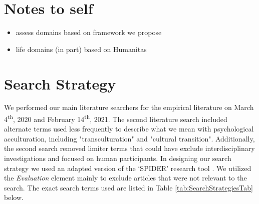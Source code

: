 \documentclass[man, 12pt, a4paper]{apa7}
\begin{document}
\section{Notes to self}
\begin{itemize}
  \item assess domains based on framework we propose
  \item life domains (in part) based on Humanitas
\end{itemize}

\printbibliography

\appendix

\section{Search Strategy}
\label{app:AppendixSearchStrategy}

We performed our main literature searchers for the empirical literature on March 4\textsuperscript{th}, 2020 and February 14\textsuperscript{th}, 2021. The second literature search included alternate terms used less frequently to describe what we mean with psychological acculturation, including "transculturation" and "cultural transition". Additionally, the second search removed limiter terms that could have exclude interdisciplinary investigations and focused on human participants.
In designing our search strategy we used an adapted version of the `SPIDER' research tool \citep[e.g.,][]{Cooke2012}. We utilized the \textit{Evaluation} element mainly to exclude articles that were not relevant to the search. The exact search terms used are listed in Table \ref{tab:SearchStrategiesTab} below.


\end{document}
